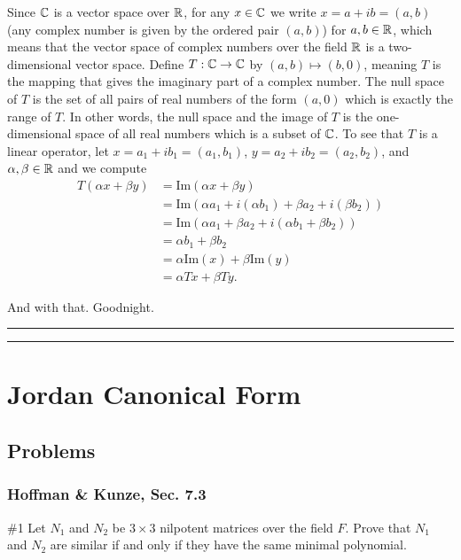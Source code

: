 \documentclass{article}
\begin{document}
	Since $\mathbb C$ is a vector space over $\mathbb R$, for any $x\in \mathbb C$ we write $x = a+ ib = (a, b)$ (any complex number is given by the ordered pair $(a,b)$) for 
	$a,b\in\mathbb R$, which means that the vector space of complex numbers over the field $\mathbb R$ is a two-dimensional vector space. Define $T:\mathbb C\to\mathbb C$ by
	 $(a,b) \mapsto (b,0)$, meaning $T$ is the mapping that gives the imaginary part of a complex number. The null space of $T$ is the set of all pairs
	  of real numbers of the form $(a,0)$ which is exactly the range of $T$. In other words, the null space and the image of $T$ is the one-dimensional space of 
	  all real numbers which is a subset of $\mathbb C$. To see that $T$ is a linear operator, let $x = a_1 + ib_1 = (a_1, b_1)$, $y = a_2 + ib_2 = (a_2, b_2)$, and
	  $\alpha, \beta\in\mathbb R$ and we compute 
	  	\begin{align*}
			T(\alpha x+ \beta y) & = \text{Im}(\alpha x+ \beta y)\\
						       & = \text{Im}(\alpha a_1 + i(\alpha b_1) + \beta a_2 + i (\beta b_2))\\
						       & = \text{Im}(\alpha a_1 + \beta a_2 + i(\alpha b_1 + \beta b_2))\\
						       & = \alpha b_1 + \beta b_2\\
						       & = \alpha \text{Im}(x) + \beta  \text{Im}(y)\\
						       & = \alpha Tx + \beta Ty.
		\end{align*}

And with that. Goodnight.\\

\hrule \vspace{2pts}
\hrule

\break 

\section{Jordan Canonical Form}

\subsection{Problems}

\subsubsection{Hoffman \& Kunze, Sec. 7.3}

\begin{problem}{\#1} Let $N_1$ and $N_2$ be $3 \times 3$ nilpotent matrices over the field $F$. Prove that $N_1$ and $N_2$ are similar if and only if they have the same minimal polynomial.
\end{problem}
\end{document}
